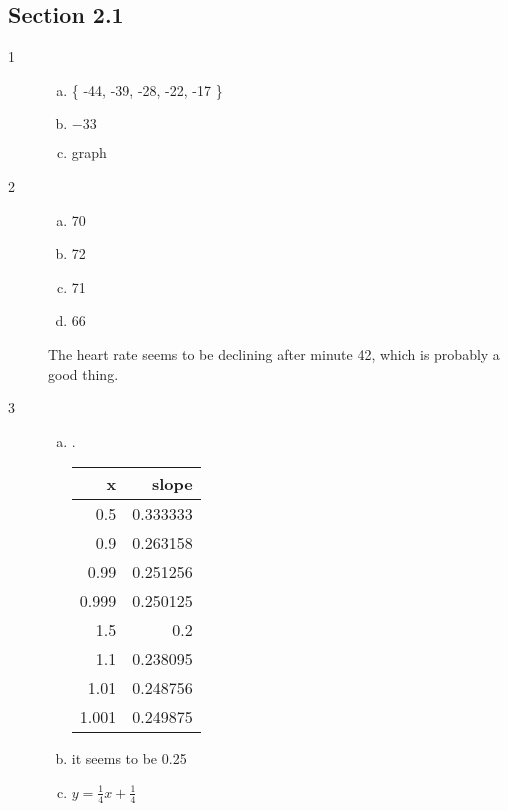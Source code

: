 \documentclass[letterpaper, landscape]{exam}
\begin{document}
    \subsection{Section 2.1}
    \begin{description}

      \item[1]
        \begin{enumerate}[(a)]
          \item \{ -44, -39, -28, -22, -17 \}
          \item $-33$
          \item graph
        \end{enumerate}

      \item[2]
        \begin{enumerate}[(a)]
          \item 70
          \item 72
          \item 71
          \item 66
        \end{enumerate}

        The heart rate seems to be declining after minute 42, which is probably
        a good thing.

      \item[3]
        \begin{enumerate}[(a)]
          \item .

            \begin{tabular}[H]{rr}
              \toprule
              x     & slope \\
              \midrule
              0.5   & 0.333333 \\
              0.9   & 0.263158 \\
              0.99  & 0.251256 \\
              0.999 & 0.250125 \\
              1.5   & 0.2 \\
              1.1   & 0.238095 \\
              1.01  & 0.248756 \\
              1.001 & 0.249875 \\
            \end{tabular}

          \item it seems to be 0.25

          \item $y = \frac{1}{4} x + \frac{1}{4}$


\end{enumerate}
\end{description}
\end{document}
